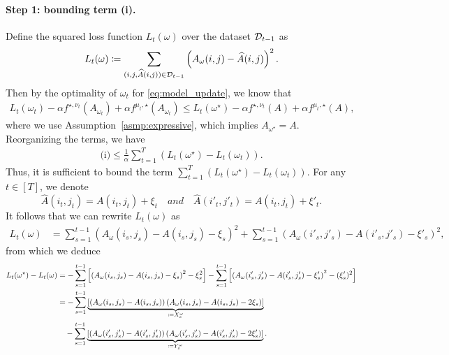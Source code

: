 \paragraph{Step 1: bounding term (i).} Define the squared loss function $L_t(\omega)$ over the dataset ${\mathcal{D}}_{t-1}$ as
\begin{align}\label{eq:L}
    L_t(\omega)\coloneqq \sum_{(i,j,\widehat{A}(i,j))\in{\mathcal{D}}_{t-1}}\left(A_\omega(i,j)-\widehat{A}(i,j)\right)^2.
\end{align}
Then by the optimality of $\omega_t$ for \eqref{eq:model_update}, we know that
\begin{align*}
    L_t(\omega_t) - \alpha f^{\star,\nu_t}(A_{\omega_t}) + \alpha f^{\mu_t,\star}(A_{\omega_t})\leq L_t(\omega^\star) - \alpha f^{\star,\nu_t}(A) + \alpha f^{\mu_t,\star}(A),
\end{align*}
where we use Assumption~\ref{asmp:expressive}, which implies $A_{\omega^\star}=A$.
Reorganizing the terms, we have
\begin{align}\label{eq:(i)_ub_by_L}
    \text{(i)}\leq \frac{1}{\alpha}\sum_{t=1}^T\left(L_t(\omega^\star)-L_t(\omega_t)\right).
\end{align}
Thus, it is sufficient to bound the term $\sum_{t=1}^T\left(L_t(\omega^\star)-L_t(\omega_t)\right)$. 
For any $t\in[T]$, we denote
$$\widehat{A}(i_t,j_t)=A(i_t,j_t)+\xi_t\quad{and}\quad  \widehat{A}(i'_t,j'_t)=A(i_t,j_t)+\xi'_t.$$
It follows that we can rewrite $L_t(\omega)$ as
\begin{align*}
    L_t(\omega)&=\sum_{s=1}^{t-1} \left(A_\omega(i_s,j_s)-A(i_s,j_s)-\xi_s\right)^2+\sum_{s=1}^{t-1} \left(A_\omega(i'_s,j'_s)-A(i'_s,j'_s)-\xi'_s\right)^2,
\end{align*}
from which we deduce
\begin{align}\label{eq:L_decomposition}
    L_t(\omega^\star)-L_t(\omega) 
    &=-\sum_{s=1}^{t-1} \left[\left(A_\omega(i_s,j_s)-A(i_s,j_s)-\xi_s\right)^2 - \xi_s^2\right]
    -\sum_{s=1}^{t-1} \left[\left(A_\omega(i'_s,j'_s)-A(i'_s,j'_s)-\xi'_s\right)^2 - (\xi'_s)^2\right]\notag\\ 
    &= -\sum_{s=1}^{t-1} \underbrace{\left[\left(A_\omega(i_s,j_s)-A(i_s,j_s)\right)\left(A_\omega(i_s,j_s)-A(i_s,j_s)-2\xi_s\right)\right]}_{\coloneqq X_s^\omega}\notag\\
    &\quad-\sum_{s=1}^{t-1} \underbrace{\left[\left(A_\omega(i'_s,j'_s)-A(i'_s,j'_s)\right)\left(A_\omega(i'_s,j'_s)-A(i'_s,j'_s)-2\xi'_s\right)\right]}_{\coloneqq Y_s^\omega}.
\end{align}

